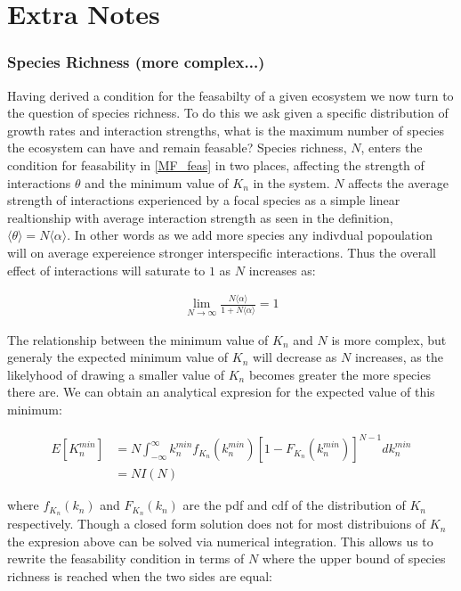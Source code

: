 \documentclass{article}
\begin{document}
\section{Extra Notes}
\subsubsection{Species Richness (more complex...)}
Having derived a condition for the feasabilty of a given ecosystem we now turn to the question of species richness. To do this we ask given a specific distribution of growth rates and interaction strengths, what is the maximum number of species the ecosystem can have and remain feasable? Species richness, $N$, enters the condition for feasability in \cref{MF_feas} in two places, affecting the strength of interactions $\theta$ and the minimum value of $K_n$ in the system. $N$ affects the average strength of interactions experienced by a focal species as a simple linear realtionship with average interaction strength as seen in the definition, $\langle \theta \rangle = N \langle \alpha \rangle$. In other words as we add more species any indivdual popoulation will on average expereience stronger interspecific interactions. Thus the overall effect of interactions will saturate to $1$ as $N$ increases as:

\begin{align}
  \lim_{N \to \infty } \frac{N \langle \alpha \rangle}{1 + N \langle \alpha \rangle} = 1
\end{align}

The relationship between the minimum value of $K_n$ and $N$ is more complex, but generaly the expected minimum value of $K_n$ will decrease as $N$ increases, as the likelyhood of drawing a smaller value of $K_n$ becomes greater the more species there are. We can obtain an analytical expresion for the expected value of this minimum:

\begin{align}
  E[K_n^{min}] &= N \int_{-\infty}^{\infty} k_n^{min} f_{K_n}(k_n^{min}) \left[1 -  F_{K_n}(k_n^{min}) \right]^{N-1} dk_n^{min}
\\
               &= N I(N)
\end{align}

where $f_{K_n}(k_n)$ and $F_{K_n}(k_n)$ are the pdf and cdf of the distribution of $K_n$ respectively. Though a closed form solution does not for most distribuions of $K_n$ the expresion above can be solved via numerical integration. This allows us to rewrite the feasability condition in terms of $N$ where the upper bound of species richness is reached when the two sides are equal:
\end{document}
